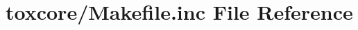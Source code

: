 \hypertarget{toxcore_2_makefile_8inc}{\section{toxcore/\+Makefile.inc File Reference}
\label{toxcore_2_makefile_8inc}
}
